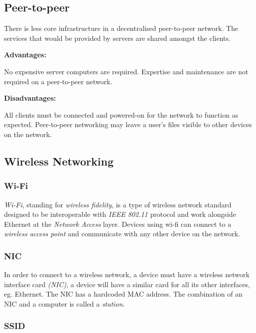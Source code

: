 \documentclass[9pt]{article}
\begin{document}
\subsection{Peer-to-peer}
\label{sec:orgce3302a}

There is less core infrastructure in a decentralised peer-to-peer network. The services that would be provided by servers are shared amongst the clients.

\textbf{Advantages:}

No expensive server computers are required. Expertise and maintenance are not required on a peer-to-peer network.

\textbf{Disadvantages:}

All clients must be connected and powered-on for the network to function as expected. Peer-to-peer networking may leave a user's files visible to other devices on the network.

\subsection{Wireless Networking}
\label{sec:orgcaa4f64}
\subsubsection{Wi-Fi}
\label{sec:org856649a}

\emph{Wi-Fi}, standing for \emph{wireless fidelity}, is a type of wireless network standard designed to be interoperable with \emph{IEEE 802.11} protocol and work alongside Ethernet at the \emph{Network Access} layer. Devices using wi-fi can connect to a \emph{wireless access point} and communicate with any other device on the network.

\subsubsection{NIC}
\label{sec:orgd33b9d0}

In order to connect to a wireless network, a device must have a wireless network interface card \emph{(NIC)}, a device will have a similar card for all its other interfaces, eg. Ethernet. The NIC has a hardcoded MAC address. The combination of an NIC and a computer is called a \emph{station}.

\subsubsection{SSID}
\label{sec:orga687291}
\end{document}
